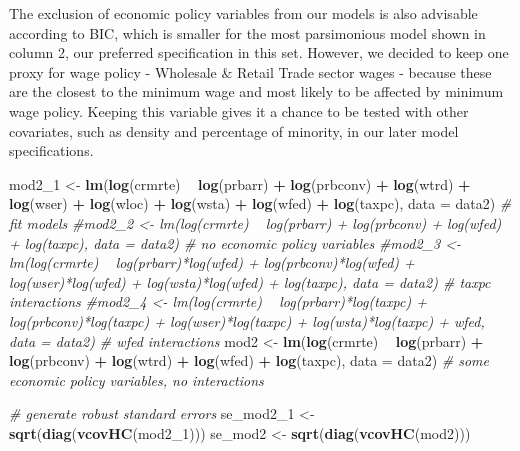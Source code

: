 \documentclass[]{article}
\newenvironment{Shaded}{\begin{snugshade}}{\end{snugshade}}
\newcommand{\CommentTok}[1]{\textcolor[rgb]{0.56,0.35,0.01}{\textit{#1}}}
\newcommand{\DataTypeTok}[1]{\textcolor[rgb]{0.13,0.29,0.53}{#1}}
\newcommand{\DecValTok}[1]{\textcolor[rgb]{0.00,0.00,0.81}{#1}}
\newcommand{\KeywordTok}[1]{\textcolor[rgb]{0.13,0.29,0.53}{\textbf{#1}}}
\newcommand{\NormalTok}[1]{#1}
\newcommand{\OperatorTok}[1]{\textcolor[rgb]{0.81,0.36,0.00}{\textbf{#1}}}
\newcommand{\StringTok}[1]{\textcolor[rgb]{0.31,0.60,0.02}{#1}}
\begin{document}
The exclusion of economic policy variables from our models is also
advisable according to BIC, which is smaller for the most parsimonious
model shown in column 2, our preferred specification in this set.
However, we decided to keep one proxy for wage policy - Wholesale \&
Retail Trade sector wages - because these are the closest to the minimum
wage and most likely to be affected by minimum wage policy. Keeping this
variable gives it a chance to be tested with other covariates, such as
density and percentage of minority, in our later model specifications.

\begin{Shaded}
\begin{Highlighting}[]
\NormalTok{mod2_}\DecValTok{1}\NormalTok{ <-}\StringTok{ }\KeywordTok{lm}\NormalTok{(}\KeywordTok{log}\NormalTok{(crmrte) }\OperatorTok{~}\StringTok{ }\KeywordTok{log}\NormalTok{(prbarr) }\OperatorTok{+}\StringTok{ }\KeywordTok{log}\NormalTok{(prbconv) }\OperatorTok{+}\StringTok{ }\KeywordTok{log}\NormalTok{(wtrd) }\OperatorTok{+}\StringTok{ }\KeywordTok{log}\NormalTok{(wser) }\OperatorTok{+}\StringTok{ }\KeywordTok{log}\NormalTok{(wloc) }\OperatorTok{+}\StringTok{ }\KeywordTok{log}\NormalTok{(wsta) }\OperatorTok{+}\StringTok{ }\KeywordTok{log}\NormalTok{(wfed) }\OperatorTok{+}\StringTok{ }\KeywordTok{log}\NormalTok{(taxpc), }\DataTypeTok{data =}\NormalTok{ data2)}
\CommentTok{# fit models}
\CommentTok{#mod2_2 <- lm(log(crmrte) ~ log(prbarr) + log(prbconv) + log(wfed) + log(taxpc), data = data2)  # no economic policy variables}
\CommentTok{#mod2_3 <- lm(log(crmrte) ~ log(prbarr)*log(wfed) + log(prbconv)*log(wfed) + log(wser)*log(wfed) + log(wsta)*log(wfed) + log(taxpc), data = data2)  # taxpc interactions}
\CommentTok{#mod2_4 <- lm(log(crmrte) ~ log(prbarr)*log(taxpc) + log(prbconv)*log(taxpc) + log(wser)*log(taxpc) + log(wsta)*log(taxpc) + wfed, data = data2)  # wfed interactions}
\NormalTok{mod2 <-}\StringTok{ }\KeywordTok{lm}\NormalTok{(}\KeywordTok{log}\NormalTok{(crmrte) }\OperatorTok{~}\StringTok{ }\KeywordTok{log}\NormalTok{(prbarr) }\OperatorTok{+}\StringTok{ }\KeywordTok{log}\NormalTok{(prbconv) }\OperatorTok{+}\StringTok{ }\KeywordTok{log}\NormalTok{(wtrd)  }\OperatorTok{+}\StringTok{ }\KeywordTok{log}\NormalTok{(wfed) }\OperatorTok{+}\StringTok{ }\KeywordTok{log}\NormalTok{(taxpc), }\DataTypeTok{data =}\NormalTok{ data2)   }\CommentTok{# some economic policy variables, no interactions}

\CommentTok{# generate robust standard errors}
\NormalTok{se_mod2_}\DecValTok{1}\NormalTok{ <-}\StringTok{ }\KeywordTok{sqrt}\NormalTok{(}\KeywordTok{diag}\NormalTok{(}\KeywordTok{vcovHC}\NormalTok{(mod2_}\DecValTok{1}\NormalTok{)))}
\NormalTok{se_mod2 <-}\StringTok{ }\KeywordTok{sqrt}\NormalTok{(}\KeywordTok{diag}\NormalTok{(}\KeywordTok{vcovHC}\NormalTok{(mod2)))}


\end{Highlighting}
\end{Shaded}
\end{document}
